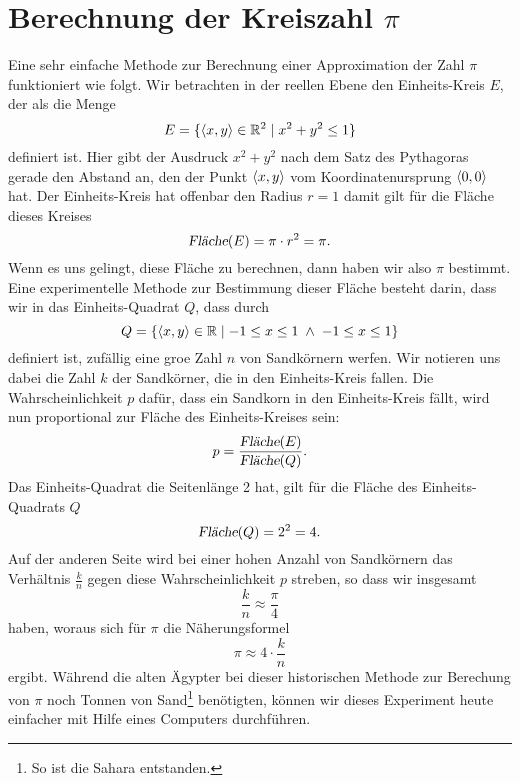 \section{Berechnung der Kreiszahl $\pi$}
Eine sehr einfache Methode zur Berechnung einer Approximation der Zahl $\pi$ funktioniert wie folgt.
Wir betrachten in der reellen Ebene den Einheits-Kreis $E$, der als die Menge
\[ E = \{ \pair(x,y) \in \mathbb{R}^2 \mid x^2 + y^2 \leq 1 \} \]
definiert ist.  Hier gibt der Ausdruck $x^2 + y^2$ nach dem Satz des Pythagoras gerade den Abstand an,
den der Punkt $\pair(x,y)$ vom Koordinatenursprung $\pair(0,0)$ hat.  Der Einheits-Kreis hat offenbar den
Radius $r = 1$ damit gilt f\"ur die Fl\"ache dieses Kreises
\[ \textsl{Fl\"ache}(E) = \pi \cdot r^2 = \pi. \]
Wenn es uns gelingt, diese Fl\"ache zu berechnen, dann haben wir also $\pi$ bestimmt.  Eine experimentelle
Methode zur Bestimmung dieser Fl\"ache besteht darin, dass wir in das Einheits-Quadrat $Q$, dass durch
\[ Q = \{ \pair(x,y) \in \mathbb{R} \mid -1 \leq x \leq 1 \;\wedge\; -1 \leq x \leq 1 \} \]
definiert ist, zuf\"allig eine gro\3e Zahl $n$ von Sandk\"ornern werfen.  Wir notieren uns dabei die Zahl $k$ 
der Sandk\"orner, die in den Einheits-Kreis fallen.  Die Wahrscheinlichkeit $p$ daf\"ur, dass ein Sandkorn in den
Einheits-Kreis f\"allt, wird nun proportional zur Fl\"ache des Einheits-Kreises sein:
\[ p = \frac{\textsl{Fl\"ache}(E)}{\textsl{Fl\"ache}(Q)}. \]
Das Einheits-Quadrat die Seitenl\"ange 2 hat, gilt f\"ur die Fl\"ache des Einheits-Quadrats $Q$ 
\[ \textsl{Fl\"ache}(Q) = 2^2 = 4. \]
Auf der anderen Seite wird bei einer hohen Anzahl von Sandk\"ornern das Verh\"altnis $\frac{k}{n}$ gegen diese
Wahrscheinlichkeit $p$ streben, so dass wir insgesamt
\[ \frac{k}{n} \approx \frac{\pi}{4} \]
haben, woraus sich f\"ur $\pi$ die N\"aherungsformel
\[ \pi \approx 4 \cdot \frac{k}{n} \]
ergibt.  W\"ahrend die alten \"Agypter bei dieser historischen Methode zur Berechung von $\pi$ noch Tonnen von
Sand\footnote{So ist die Sahara entstanden.}
ben\"otigten,  k\"onnen wir dieses Experiment heute einfacher mit Hilfe eines Computers durchf\"uhren.

